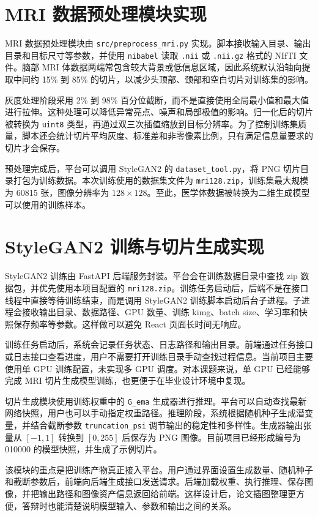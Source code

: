 \section{MRI 数据预处理模块实现}
MRI 数据预处理模块由 \texttt{src/preprocess\_mri.py} 实现。脚本接收输入目录、输出目录和目标尺寸等参数，并使用 \texttt{nibabel} 读取 \texttt{.nii} 或 \texttt{.nii.gz} 格式的 NIfTI 文件。脑部 MRI 体数据两端常包含较大背景或低信息区域，因此系统默认沿轴向提取中间约 15\% 到 85\% 的切片，以减少头顶部、颈部和空白切片对训练集的影响。

灰度处理阶段采用 2\% 到 98\% 百分位截断，而不是直接使用全局最小值和最大值进行拉伸。这种处理可以降低异常亮点、噪声和局部极值的影响。归一化后的切片被转换为 \texttt{uint8} 类型，再通过双三次插值缩放到目标分辨率。为了控制训练集质量，脚本还会统计切片平均灰度、标准差和非零像素比例，只有满足信息量要求的切片才会保存。

预处理完成后，平台可以调用 StyleGAN2 的 \texttt{dataset\_tool.py}，将 PNG 切片目录打包为训练数据。本次训练使用的数据集文件为 \texttt{mri128.zip}，训练集最大规模为 60815 张，图像分辨率为 $128\times128$。至此，医学体数据被转换为二维生成模型可以使用的训练样本。

\section{StyleGAN2 训练与切片生成实现}
StyleGAN2 训练由 FastAPI 后端服务封装。平台会在训练数据目录中查找 zip 数据包，并优先使用本项目配置的 \texttt{mri128.zip}。训练任务启动后，后端不是在接口线程中直接等待训练结束，而是调用 StyleGAN2 训练脚本启动后台子进程。子进程会接收输出目录、数据路径、GPU 数量、训练 kimg、batch size、学习率和快照保存频率等参数。这样做可以避免 React 页面长时间无响应。

训练任务启动后，系统会记录任务状态、日志路径和输出目录。前端通过任务接口或日志接口查看进度，用户不需要打开训练目录手动查找过程信息。当前项目主要使用单 GPU 训练配置，未实现多 GPU 调度。对本课题来说，单 GPU 已经能够完成 MRI 切片生成模型训练，也更便于在毕业设计环境中复现。

切片生成模块使用训练权重中的 \texttt{G\_ema} 生成器进行推理。平台可以自动查找最新网络快照，用户也可以手动指定权重路径。推理阶段，系统根据随机种子生成潜变量，并结合截断参数 \texttt{truncation\_psi} 调节输出的稳定性和多样性。生成器输出张量从 $[-1,1]$ 转换到 $[0,255]$ 后保存为 PNG 图像。目前项目已经形成编号为 010000 的模型快照，并生成了示例切片。

该模块的重点是把训练产物真正接入平台。用户通过界面设置生成数量、随机种子和截断参数后，前端向后端生成接口发送请求。后端加载权重、执行推理、保存图像，并把输出路径和图像资产信息返回给前端。这样设计后，论文插图整理更方便，答辩时也能清楚说明模型输入、参数和输出之间的关系。

